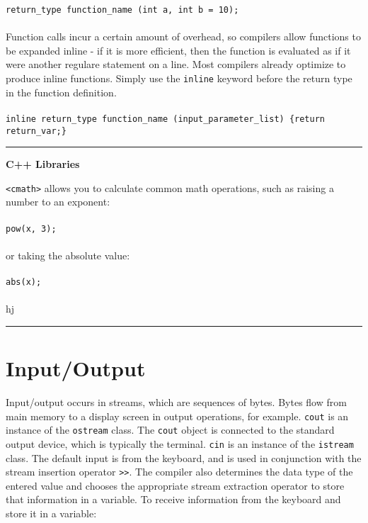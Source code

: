 \documentclass[10pt]{article}
\begin{document}
\begin{flushleft}
\color{red}\texttt{return\_type function\_name (int a, int b = 10);}\color{black}\\
\\
Function calls incur a certain amount of overhead, so compilers allow functions to be expanded inline - if it is more efficient, then the function is evaluated as if it were another regulare statement on a line. Most compilers already optimize to produce inline functions. Simply use the \texttt{inline} keyword before the return type in the function definition.\\
\\
\color{red}\texttt{inline return\_type function\_name (input\_parameter\_list) \{return return\_var;\}}\color{black}\\
\newline
\noindent\rule{16.5cm}{0.4pt}
\end{flushleft}

\begin{centering}
\color{blue}\textbf{C++ Libraries}\color{black}
\end{centering}
\begin{flushleft}\justify
\texttt{\textless cmath\textgreater} allows you to calculate common math operations, such as raising a number to an exponent:\\
\\
\color{red}\texttt{pow(x, 3);}\color{black}\\
\\
or taking the absolute value:\\
\\
\color{red}\texttt{abs(x);}\color{black}\\
\\
hj
\newline
\noindent\rule{16.5cm}{0.4pt}
\end{flushleft}

\section{Input/Output}

Input/output occurs in streams, which are sequences of bytes. Bytes flow from main memory to a display screen in output operations, for example. \texttt{cout} is an instance of the \texttt{ostream} class. The \texttt{cout} object is connected to the standard output device, which is typically the terminal. \texttt{cin} is an instance of the \texttt{istream} class. The default input is from the keyboard, and is used in conjunction with the stream insertion operator \texttt{>>}. The compiler also determines the data type of the entered value and chooses the appropriate stream extraction operator to store that information in a variable. To receive information from the keyboard and store it in a variable:
\end{document}
